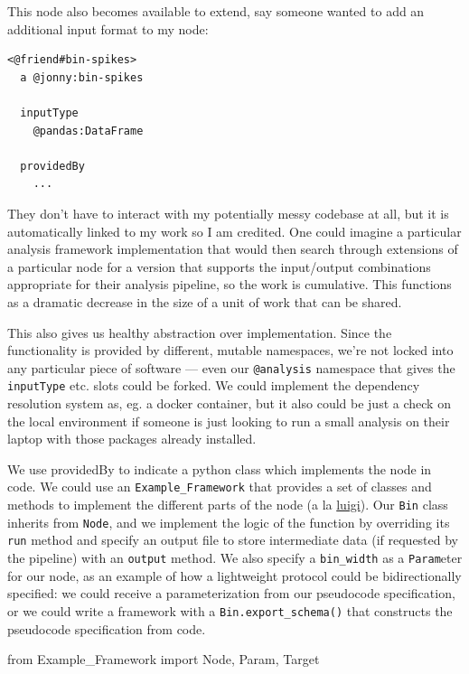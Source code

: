 \documentclass[10pt]{article}
\newenvironment{Shaded}{}{}
\newcommand{\ImportTok}[1]{#1}
\newcommand{\NormalTok}[1]{#1}
\begin{document}
\begin{multicols}{2}
This node also becomes available to extend, say someone wanted to add an
additional input format to my node:

\begin{verbatim}
<@friend#bin-spikes>
  a @jonny:bin-spikes

  inputType
    @pandas:DataFrame

  providedBy
    ...
\end{verbatim}

They don't have to interact with my potentially messy codebase at all,
but it is automatically linked to my work so I am credited. One could
imagine a particular analysis framework implementation that would then
search through extensions of a particular node for a version that
supports the input/output combinations appropriate for their analysis
pipeline, so the work is cumulative. This functions as a dramatic
decrease in the size of a unit of work that can be shared.

This also gives us healthy abstraction over implementation. Since the
functionality is provided by different, mutable namespaces, we're not
locked into any particular piece of software --- even our
\texttt{@analysis} namespace that gives the \texttt{inputType} etc.
slots could be forked. We could implement the dependency resolution
system as, eg. a docker container, but it also could be just a check on
the local environment if someone is just looking to run a small analysis
on their laptop with those packages already installed.

We use providedBy to indicate a python class which implements the node
in code. We could use an \texttt{Example\_Framework} that provides a set
of classes and methods to implement the different parts of the node (a
la \href{https://luigi.readthedocs.io/en/stable/tasks.html}{luigi}). Our
\texttt{Bin} class inherits from \texttt{Node}, and we implement the
logic of the function by overriding its \texttt{run} method and specify
an output file to store intermediate data (if requested by the pipeline)
with an \texttt{output} method. We also specify a \texttt{bin\_width} as
a \texttt{Param}eter for our node, as an example of how a lightweight
protocol could be bidirectionally specified: we could receive a
parameterization from our pseudocode specification, or we could write a
framework with a \texttt{Bin.export\_schema()} that constructs the
pseudocode specification from code.

\begin{Shaded}
\begin{Highlighting}[]
\ImportTok{from}\NormalTok{ Example\_Framework }\ImportTok{import}\NormalTok{ Node, Param, Target}


\end{Highlighting}
\end{Shaded}
\end{multicols}
\end{document}
